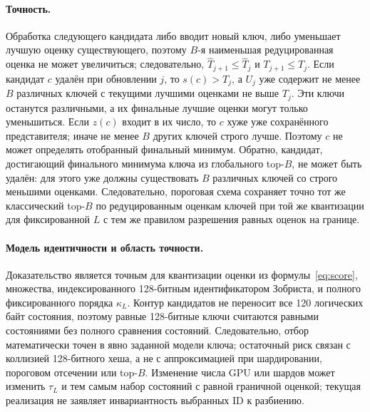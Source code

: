 \documentclass[10pt,twocolumn]{article}
\newcommand{\beam}{B}
\begin{document}
\paragraph{Точность.}
Обработка следующего кандидата либо вводит новый ключ, либо уменьшает лучшую
оценку существующего, поэтому $\beam$-я наименьшая редуцированная оценка не может
увеличиться; следовательно, $\widehat T_{j+1}\leq\widehat T_j$ и
$T_{j+1}\leq T_j$. Если кандидат $c$ удалён при обновлении $j$, то
$s(c)>T_j$, а $U_j$ уже содержит не менее $\beam$ различных ключей с текущими
лучшими оценками не выше $T_j$. Эти ключи останутся различными, а их финальные
лучшие оценки могут только уменьшиться. Если $z(c)$ входит в их число, то $c$
хуже уже сохранённого представителя; иначе не менее $\beam$ других ключей
строго лучше. Поэтому $c$ не может определять отобранный финальный минимум.
Обратно, кандидат, достигающий финального минимума ключа из глобального
top-$\beam$, не может быть удалён: для этого уже должны существовать $\beam$
различных ключей со строго меньшими оценками. Следовательно, пороговая схема
сохраняет точно тот же классический top-$\beam$ по редуцированным оценкам ключей
при той же квантизации для фиксированной $L$ с тем же правилом разрешения
равных оценок на границе.

\paragraph{Модель идентичности и область точности.}
Доказательство является точным для квантизации оценки из
формулы~\eqref{eq:score}, множества, индексированного 128-битным идентификатором
Зобриста, и полного фиксированного порядка $\kappa_L$.
Контур кандидатов не
переносит все 120 логических байт состояния, поэтому равные 128-битные ключи
считаются равными состояниями без полного сравнения состояний. Следовательно,
отбор математически точен в явно заданной модели ключа; остаточный риск связан
с коллизией 128-битного хеша, а не с аппроксимацией при шардировании,
пороговом отсечении или top-$\beam$. Изменение числа GPU или шардов может
изменить $\tau_L$ и тем самым набор состояний с равной граничной оценкой;
текущая реализация не заявляет инвариантность выбранных ID к разбиению.
\end{document}
